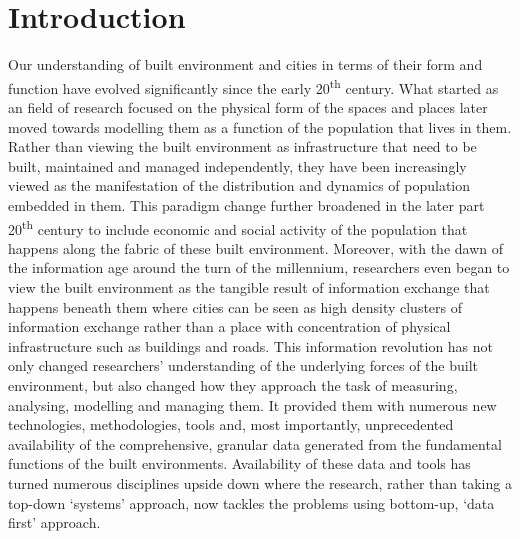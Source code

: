 \chapter{Introduction}

Our understanding of built environment and cities in terms of their form and function have evolved significantly since the early 20\textsuperscript{th} century.
What started as an field of research focused on the physical form of the spaces and places later moved towards modelling them as a function of the population that lives in them. 
Rather than viewing the built environment as infrastructure that need to be built, maintained and managed independently, they have been increasingly viewed as the manifestation of the distribution and dynamics of population embedded in them.
This paradigm change further broadened in the later part 20\textsuperscript{th} century to include economic and social activity of the population that happens along the fabric of these built environment.
Moreover, with the dawn of the information age around the turn of the millennium, researchers even began to view the built environment as the tangible result of information exchange that happens beneath them where cities can be seen as high density clusters of information exchange rather than a place with concentration of physical infrastructure such as buildings and roads.
This information revolution has not only changed researchers' understanding of the underlying forces of the built environment, but also changed how they approach the task of measuring, analysing, modelling and managing them.
It provided them with numerous new technologies, methodologies, tools and, most importantly, unprecedented availability of the comprehensive, granular data generated from the fundamental functions of the built environments.
Availability of these data and tools has turned numerous disciplines upside down where the research, rather than taking a top-down `systems' approach, now tackles the problems using bottom-up, `data first' approach. 

